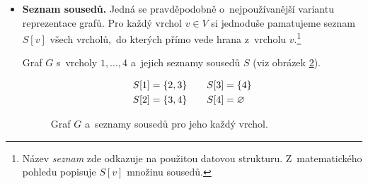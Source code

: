 \begin{itemize}
    \begin{example}
        Graf $G$ má $4$ vrcholy a~celkem $6$ hran (viz obrázek \ref{fig:graf_k4}); jeho matici incidence označíme $\mathbf{I}$. Řádky představují (shora dolů) vrcholy $0,1,2,3$ a~sloupce (zleva doprava) jednotlivé hrany $e_1,\dots,e_6$.
        \begin{figure}[ht]
            \centering
            
            \caption{Úplný graf $K_4$.}
            \label{fig:graf_k4}
        \end{figure}
        \[\mathbf{I}=\left(\begin{matrix}
            1 & 0 & 0 & 1 & 1 & 0\\
            1 & 1 & 0 & 0 & 0 & 1\\
            0 & 1 & 1 & 0 & 1 & 0\\
            0 & 0 & 1 & 1 & 0 & 1
        \end{matrix}\right)\]
    \end{example}
    \item \textbf{Seznam sousedů.} Jedná se pravděpodobně o~nejpoužívanější variantu reprezentace grafů. Pro každý vrchol $v\in V$ si jednoduše pamatujeme seznam $S[v]$ všech vrcholů,~do kterých přímo vede hrana z~vrcholu $v$.\footnote{Název \emph{seznam} zde odkazuje na použitou datovou strukturu. Z~matematického pohledu popisuje $S[v]$ množinu sousedů.}
    \begin{example}
        Graf $G$ s~vrcholy $1,\dots,4$ a~jejich seznamy sousedů $S$ (viz obrázek \ref{fig:graf_seznam_sousedu}).
        \begin{figure}[ht]
            \centering
            \begin{subfigure}{6cm}
                \centering
                
            \end{subfigure}
            \qquad
            \begin{subfigure}{6cm}
                \centering
                \begin{align*}
                    S[1]=\left\{2,3\right\}&\qquad S[3]=\left\{4\right\}\\
                    S[2]=\left\{3,4\right\}&\qquad S[4]=\varnothing
                \end{align*}
                \vfill
            \end{subfigure}
            \caption{Graf $G$ a~seznamy sousedů pro jeho každý vrchol.}
            \label{fig:graf_seznam_sousedu}
        \end{figure}
    \end{example}
\end{itemize}

